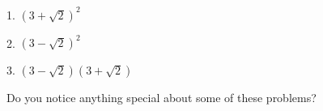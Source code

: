 \documentclass[12pt]{article}
\begin{document}
\vspace{1.5em} 

1. $(3+\sqrt{2})^{2}$ 

\vspace{4.5em} 

2. $(3-\sqrt{2})^{2}$ 

\vspace{4.5em} 

3. $(3-\sqrt{2})(3+\sqrt{2})$

\vspace{4.5em} Do you notice anything special about some of these problems? 
\end{document}
